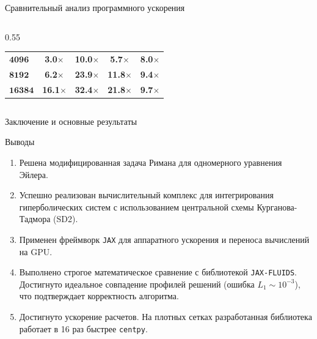 \documentclass[ignoreonframetext,unicode,aspectratio=169]{beamer}
\begin{document}
\begin{frame}{Сравнительный анализ программного ускорения}
\begin{columns}[c]
\begin{column}{0.55\textwidth}
\begin{table}[h]
{\begin{tabular}{lcccc}
							$\mathbf{4096}$  & \textbf{3.0$\times$} & \textbf{10.0$\times$} & \textbf{5.7$\times$}  & \textbf{8.0$\times$} \\
							$\mathbf{8192}$  & \textbf{6.2$\times$} & \textbf{23.9$\times$} & \textbf{11.8$\times$} & \textbf{9.4$\times$} \\
							$\mathbf{16384}$ & \textbf{16.1$\times$}& \textbf{32.4$\times$} & \textbf{21.8$\times$} & \textbf{9.7$\times$} \\
							\hline
						\end{tabular}
					}
				\end{table}
				
			\end{column}
		\end{columns}
		
	\end{frame}
	

	\begin{frame}{Заключение и основные результаты}
		
		\begin{block}{Выводы}
			\begin{enumerate}
				\item Решена модифицированная задача Римана для одномерного уравнения Эйлера.
				\item Успешно реализован вычислительный комплекс для интегрирования гиперболических систем с использованием центральной схемы Курганова-Тадмора (SD2).
				\item Применен фреймворк \texttt{JAX} для аппаратного ускорения и переноса вычислений на GPU.
				\item Выполнено строгое математическое сравнение с библиотекой \texttt{JAX-FLUIDS}. Достигнуто идеальное совпадение профилей решений (ошибка $L_1 \sim 10^{-3}$), что подтверждает корректность алгоритма.
				\item Достигнуто ускорение расчетов. На плотных сетках разработанная библиотека работает в 16 раз быстрее \texttt{centpy}.
			\end{enumerate}
		\end{block}
		
	\end{frame}
	
\end{document}
